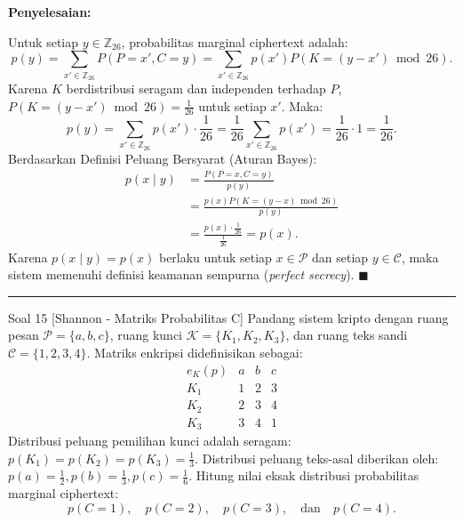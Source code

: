\documentclass[11pt,a4paper]{article}
\newenvironment{solusi}{\noindent\textbf{\textsf{Penyelesaian:}}\par\vspace{0.2em}}{\hfill$\blacksquare$\vspace{1em}\par\hrule\vspace{1em}}
\begin{document}
\begin{solusi}
Untuk setiap $y \in \mathbb{Z}_{26}$, probabilitas marginal ciphertext adalah:
\[
p(y) = \sum_{x' \in \mathbb{Z}_{26}} P(P = x', C = y) = \sum_{x' \in \mathbb{Z}_{26}} p(x') P(K = (y - x') \bmod 26).
\]
Karena $K$ berdistribusi seragam dan independen terhadap $P$, $P(K = (y - x') \bmod 26) = \frac{1}{26}$ untuk setiap $x'$. Maka:
\[
p(y) = \sum_{x' \in \mathbb{Z}_{26}} p(x') \cdot \frac{1}{26} = \frac{1}{26} \sum_{x' \in \mathbb{Z}_{26}} p(x') = \frac{1}{26} \cdot 1 = \frac{1}{26}.
\]
Berdasarkan Definisi Peluang Bersyarat (Aturan Bayes):
\begin{align*}
p(x \mid y) &= \frac{P(P = x, C = y)}{p(y)} \\
&= \frac{p(x) P(K = (y - x) \bmod 26)}{p(y)} \\
&= \frac{p(x) \cdot \frac{1}{26}}{\frac{1}{26}} = p(x).
\end{align*}
Karena $p(x \mid y) = p(x)$ berlaku untuk setiap $x \in \mathcal{P}$ dan setiap $y \in \mathcal{C}$, maka sistem memenuhi definisi keamanan sempurna (\textit{perfect secrecy}).
\end{solusi}

\begin{soalshannon}{Soal 15 [Shannon - Matriks Probabilitas C]}
Pandang sistem kripto dengan ruang pesan $\mathcal{P} = \{a, b, c\}$, ruang kunci $\mathcal{K} = \{K_1, K_2, K_3\}$, dan ruang teks sandi $\mathcal{C} = \{1, 2, 3, 4\}$. Matriks enkripsi didefinisikan sebagai:
\[
\begin{array}{c|ccc}
e_K(p) & a & b & c \\ \hline
K_1 & 1 & 2 & 3 \\
K_2 & 2 & 3 & 4 \\
K_3 & 3 & 4 & 1
\end{array}
\]
Distribusi peluang pemilihan kunci adalah seragam: $p(K_1) = p(K_2) = p(K_3) = \frac{1}{3}$.
Distribusi peluang teks-asal diberikan oleh: $p(a) = \frac{1}{2}, p(b) = \frac{1}{3}, p(c) = \frac{1}{6}$.
Hitung nilai eksak distribusi probabilitas marginal ciphertext:
\[
p(C = 1), \quad p(C = 2), \quad p(C = 3), \quad \text{dan} \quad p(C = 4).
\]
\end{soalshannon}
\end{document}
